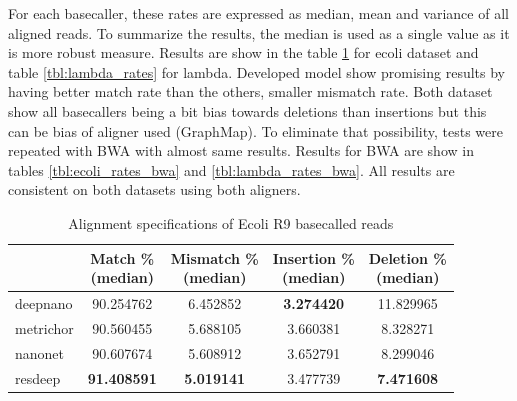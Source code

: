 \documentclass[times, utf8, diplomski, numeric, english]{fer}
\begin{document}
For each basecaller, these rates are expressed as median, mean and variance of all aligned reads. To summarize the results, the median is used as a single value as it is more robust measure. Results are show in the table \ref{tbl:ecoli_rates} for ecoli dataset and table \ref{tbl:lambda_rates} for lambda. 
Developed model show promising results by having better match rate than the others, smaller mismatch rate. Both dataset show all basecallers being a bit bias towards deletions than insertions but this can be bias of aligner used (GraphMap). To eliminate that possibility, tests were repeated with BWA with almost same results. Results for BWA are show in tables
\ref{tbl:ecoli_rates_bwa} and \ref{tbl:lambda_rates_bwa}.
All results are consistent on both datasets using both aligners.





\begin{table}[htb]
	\caption{Alignment specifications of Ecoli R9 basecalled reads}
	\label{tbl:ecoli_rates}
	\centering
	\begin{tabular}{lcccc}
		\toprule
		{} &  \thead{Match \% \\(median)} &  \thead{Mismatch \% \\(median)} &  \thead{Insertion \% \\(median)} &  \thead{Deletion \% \\(median)} \\
		\midrule
		
		deepnano   &                  90.254762 &                      6.452852 &                       \textbf{3.274420} &                     11.829965 \\
		metrichor  &                  90.560455 &                      5.688105 &                       3.660381 &                      8.328271 \\
		nanonet    &                  90.607674 &                      5.608912 &                       3.652791 &                      8.299046 \\
		resdeep    &                  \textbf{91.408591} &                     \textbf{ 5.019141} &                       3.477739 &                      \textbf{7.471608 }\\
		\bottomrule
	\end{tabular}
\end{table}
\end{document}
